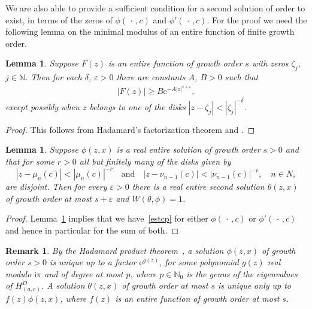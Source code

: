 \documentclass{amsart}
\newtheorem{lemma}[theorem]{Lemma}
\newtheorem{remark}[theorem]{Remark}
\numberwithin{equation}{section}
\begin{document}
We are also able to provide a sufficient condition for a second solution of order to exist, in terms of the zeros of $\phi(\,\cdot\,,c)$ and $\phi'(\,\cdot\,,c)$.
For the proof we need the following lemma on the minimal modulus of an entire function of finite growth order.

\begin{lemma}\label{lemesthp}
Suppose $F(z)$ is an entire function of growth order $s$ with zeros $\zeta_j$, $j\in{{\mathbb N}}$. Then for each $\delta$, ${\varepsilon}>0$ there are constants $A$, $B>0$ such that
\begin{align}\label{estcp}
\left|F(z) \right| \ge B {\mathrm{e}}^{-A |z|^{s+{\varepsilon}}},
\end{align}
except possibly when $z$ belongs to one of the disks $|z-\zeta_j|<|\zeta_j|^{-\delta}$.
\end{lemma}

\begin{proof}
This follows from Hadamard's factorization theorem and \cite[Lemma~2.6.18]{boas}.
\end{proof}

\begin{lemma}\label{lem:cor}
Suppose $\phi(z,x)$ is a real entire solution of growth order $s>0$ and that for some $r>0$ all but finitely many of the disks given by
\begin{equation}\label{IOestmunu}
|z-\mu_n(c)|<|\mu_n(c)|^{-r} \quad\text{and}\quad |z-\nu_{n-1}(c)|<|\nu_{n-1}(c)|^{-r}, \quad n\in N,
\end{equation}
are disjoint. Then for every ${\varepsilon}>0$ there is a real entire second solution $\theta(z,x)$ of growth order at most $s+{\varepsilon}$ and $W(\theta,\phi)=1$.
\end{lemma}

\begin{proof}
Lemma~\ref{lemesthp} implies that we have~\eqref{estcp} for either $\phi(\,\cdot\,,c)$ or $\phi'(\,\cdot\,,c)$ and hence in particular for the sum of both.
\end{proof}

\begin{remark}\label{rem:uniqExp}
By the Hadamard product theorem~\cite[Theorem~4.2.1]{lev}, a solution $\phi(z,x)$ of growth order $s>0$ is unique up to a factor ${\mathrm{e}}^{g(z)}$,
for some polynomial $g(z)$ real modulo ${\mathrm{i}}\pi$ and of degree at most $p$, where $p\in{{\mathbb N}}_0$ is the genus of the eigenvalues of $H_{(a,c)}^D$.
A solution $\theta(z,x)$ of growth order at most $s$ is unique only up to $f(z) \phi(z,x)$, where $f(z)$ is an entire function of growth order at most $s$.
\end{remark}
\end{document}
